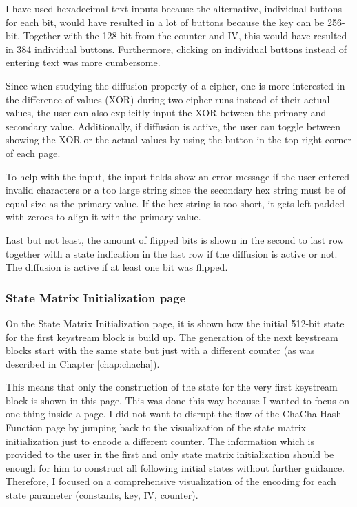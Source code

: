 I have used hexadecimal text inputs because the alternative, individual buttons for each bit, would have resulted in a lot of buttons because the key can be 256-bit. Together with the 128-bit from the counter and IV, this would have resulted in 384 individual buttons. Furthermore, clicking on individual buttons instead of entering text was more cumbersome.

Since when studying the diffusion property of a cipher, one is more interested in the difference of values (XOR) during two cipher runs instead of their actual values, the user can also explicitly input the XOR between the primary and secondary value. Additionally, if diffusion is active, the user can toggle between showing the XOR or the actual values by using the button in the top-right corner of each page.

To help with the input, the input fields show an error message if the user entered invalid characters or a too large string since the secondary hex string must be of equal size as the primary value. If the hex string is too short, it gets left-padded with zeroes to align it with the primary value.

Last but not least, the amount of flipped bits is shown in the second to last row together with a state indication in the last row if the diffusion is active or not. The diffusion is active if at least one bit was flipped.

\subsubsection{State Matrix Initialization page}

On the State Matrix Initialization page, it is shown how the initial 512-bit state for the first keystream block is build up. The generation of the next keystream blocks start with the same state but just with a different counter (as was described in Chapter \ref{chap:chacha}).

This means that only the construction of the state for the very first keystream block is shown in this page. This was done this way because I wanted to focus on one thing inside a page. I did not want to disrupt the flow of the ChaCha Hash Function page by jumping back to the visualization of the state matrix initialization just to encode a different counter. The information which is provided to the user in the first and only state matrix initialization should be enough for him to construct all following initial states without further guidance. Therefore, I focused on a comprehensive visualization of the encoding for each state parameter (constants, key, IV, counter). 

